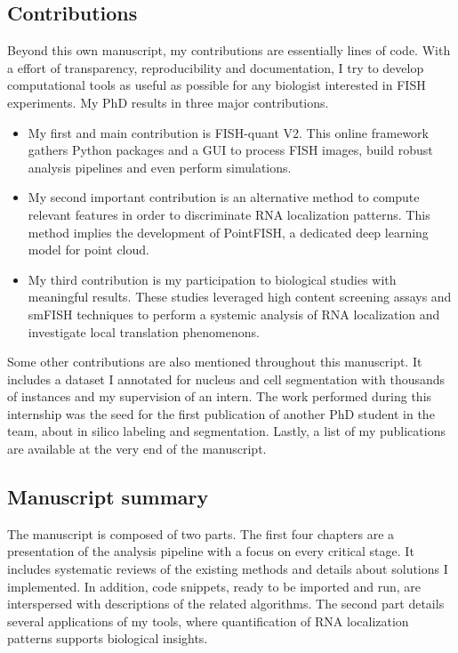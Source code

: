 \subsection{Contributions}
\label{subsec:intro_contributions}

Beyond this own manuscript, my contributions are essentially lines of code.
With a effort of transparency, reproducibility and documentation, I try to develop computational tools as useful as possible for any biologist interested in \ac{FISH} experiments.
My PhD results in three major contributions.

\begin{itemize}
	\setlength\itemsep{0.1em}
	\item My first and main contribution is FISH-quant V2.
	This online framework gathers Python packages and a \ac{GUI} to process \ac{FISH} images, build robust analysis pipelines and even perform simulations.
	\item My second important contribution is an alternative method to compute relevant features in order to discriminate \ac{RNA} localization patterns.
	This method implies the development of PointFISH, a dedicated deep learning model for point cloud.
	\item My third contribution is my participation to biological studies with meaningful results.
	These studies leveraged high content screening assays and \ac{smFISH} techniques to perform a systemic analysis of \ac{RNA} localization and investigate local translation phenomenons.
\end{itemize}

\noindent
Some other contributions are also mentioned throughout this manuscript.
It includes a dataset I annotated for nucleus and cell segmentation with thousands of instances and my supervision of an intern.
The work performed during this internship was the seed for the first publication of another PhD student in the team, about in silico labeling and segmentation.
Lastly, a list of my publications are available at the very end of the manuscript.

\subsection{Manuscript summary}
\label{subsec:intro_manuscript}

The manuscript is composed of two parts.
The first four chapters are a presentation of the analysis pipeline with a focus on every critical stage.
It includes systematic reviews of the existing methods and details about solutions I implemented.
In addition, code snippets, ready to be imported and run, are interspersed with descriptions of the related algorithms.
The second part details several applications of my tools, where quantification of \ac{RNA} localization patterns supports biological insights.

